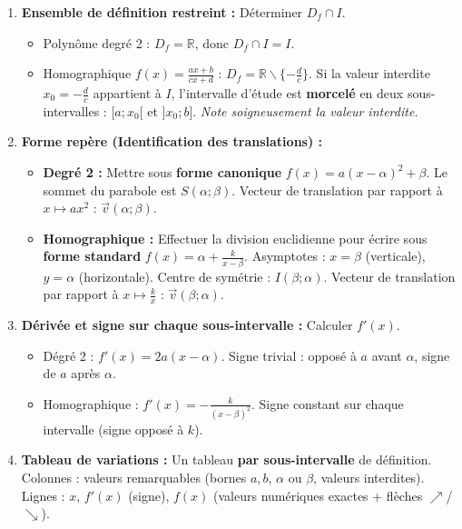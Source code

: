 \documentclass[11pt]{article}
\def\setminus{\mathbin{\backslash}}\let\smallsetminus\setminus
\begin{document}
\begin{methode}[{Algorithme d'étude complète d'une fonction sur $I=[a;b]$}]
\begin{enumerate}
    \item \textbf{Ensemble de définition restreint :} Déterminer $D_f \cap I$.
    \begin{itemize}
        \item Polynôme degré 2 : $D_f = \mathbb{R}$, donc $D_f \cap I = I$.
        \item Homographique $f(x) = \frac{ax+b}{cx+d}$ : $D_f = \mathbb{R} \setminus \{-\frac{d}{c}\}$. Si la valeur interdite $x_0 = -\frac{d}{c}$ appartient à $I$, l'intervalle d'étude est \textbf{morcelé} en deux sous-intervalles : $[a ; x_0[$ et $]x_0 ; b]$. \emph{Note soigneusement la valeur interdite.}
    \end{itemize}
    \item \textbf{Forme repère (Identification des translations) :}
    \begin{itemize}
        \item \textbf{Degré 2 :} Mettre sous \textbf{forme canonique} $f(x) = a(x-\alpha)^2 + \beta$. Le sommet du parabole est $S(\alpha ; \beta)$. Vecteur de translation par rapport à $x \mapsto ax^2$ : $\vec{v}(\alpha ; \beta)$.
        \item \textbf{Homographique :} Effectuer la division euclidienne pour écrire sous \textbf{forme standard} $f(x) = \alpha + \frac{k}{x-\beta}$. Asymptotes : $x = \beta$ (verticale), $y = \alpha$ (horizontale). Centre de symétrie : $I(\beta ; \alpha)$. Vecteur de translation par rapport à $x \mapsto \frac{k}{x}$ : $\vec{v}(\beta ; \alpha)$.
    \end{itemize}
    \item \textbf{Dérivée et signe sur chaque sous-intervalle :} Calculer $f'(x)$.
    \begin{itemize}
        \item Dégré 2 : $f'(x) = 2a(x-\alpha)$. Signe trivial : opposé à $a$ avant $\alpha$, signe de $a$ après $\alpha$.
        \item Homographique : $f'(x) = -\frac{k}{(x-\beta)^2}$. Signe constant sur chaque intervalle (signe opposé à $k$).
    \end{itemize}
    \item \textbf{Tableau de variations :} Un tableau \textbf{par sous-intervalle} de définition. Colonnes : valeurs remarquables (bornes $a, b$, $\alpha$ ou $\beta$, valeurs interdites). Lignes : $x$, $f'(x)$ (signe), $f(x)$ (valeurs numériques exactes + flèches $\nearrow$/$\searrow$).

\end{enumerate}
\end{methode}
\end{document}
